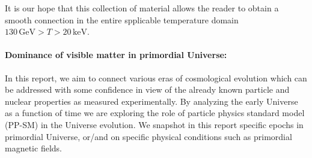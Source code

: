 It is our hope that this collection of material allows the reader to obtain a smooth connection in the entire spplicable temperature domain $130\,\mathrm{GeV}>T>20\,\mathrm{keV}$.

\paragraph{Dominance of visible matter in primordial Universe:}
In this report, we aim to connect various eras of cosmological evolution which can be addressed with some confidence in view of the already known particle and nuclear properties as measured experimentally. By analyzing the early Universe as a function of time we are exploring the role of particle physics standard model (PP-SM) in the Universe evolution. We snapshot in this report specific epochs in primordial Universe, or/and on specific physical conditions such as primordial magnetic fields.

